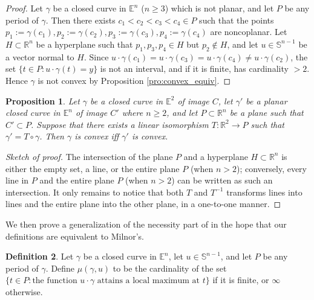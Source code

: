 \documentclass{amsart}
\newtheorem{proposition}{Proposition}[section]
\theoremstyle{definition}
\newtheorem{definition}[proposition]{Definition}
\theoremstyle{remark}
\begin{document}
\begin{proof}
    Let $\gamma$ be a closed curve in $\mathbb{E}^n$ ($n\ge 3$) which
    is not planar, and let $P$ be any period of $\gamma$.
    Then there exists $c_1<c_2<c_3<c_4\in P$ such that the points
    $p_1:=\gamma(c_1),p_2:=\gamma(c_2),
        p_3:=\gamma(c_3),p_4:=\gamma(c_4)$
    are noncoplanar. Let $H\subset\mathbb{R}^n$ be a hyperplane
    such that $p_1,p_3,p_4\in H$ but $p_2\notin H$, and let
    $u\in\mathbb{S}^{n-1}$ be a vector normal to $H$. Since
    $u\cdot\gamma(c_1)=u\cdot\gamma(c_3)=u\cdot\gamma(c_4)
        \ne u\cdot\gamma(c_2)$,
    the set $\{t\in P:u\cdot\gamma(t)=y\}$ is not an interval,
    and if it is finite, has cardinality $>2$. Hence $\gamma$
    is not convex by Proposition \ref{pro:convex_equiv}.
\end{proof}

\begin{proposition}
    Let $\gamma$ be a closed curve in $\mathbb{E}^2$ of image $C$,
    let $\gamma'$ be a planar closed curve in $\mathbb{E}^n$
    of image $C'$ where $n\ge2$, and
    let $P\subset\mathbb{R}^n$ be a plane such that $C'\subset P$.
    Suppose that there exists a linear isomorphism
    $T:\mathbb{R}^2\to P$ such that $\gamma'=T\circ\gamma$.
    Then $\gamma$ is convex iff $\gamma'$ is convex.
\end{proposition}

\begin{proof}[Sketch of proof]
    The intersection of the plane $P$ and
    a hyperplane $H\subset\mathbb{R}^n$ is either
    the empty set, a line, or the entire plane $P$ (when $n>2$);
    conversely, every line in $P$ and the entire plane $P$
    (when $n>2$) can be written as such an intersection.
    It only remains to notice that both $T$ and $T^{-1}$
    transforms lines into lines and the entire plane into
    the other plane, in a one-to-one manner.
\end{proof}

We then prove a generalization of the necessity part
of \cite[Lemma 3.3]{milnor} in the hope that
our definitions are equivalent to Milnor's.

\begin{definition}
    Let $\gamma$ be a closed curve in $\mathbb{E}^n$,
    let $u\in\mathbb{S}^{n-1}$,
    and let $P$ be any period of $\gamma$.
    Define $\mu(\gamma,u)$ to be the cardinality of the set
    $\{t\in P:\text{the function }u\cdot\gamma
        \text{ attains a local maximum at }t\}$
    if it is finite, or $\infty$ otherwise.
\end{definition}
\end{document}
